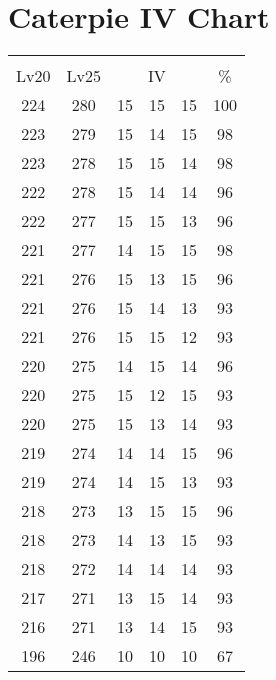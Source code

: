 \documentclass{article}%
\begin{document}
%
\normalsize%
\section{Caterpie IV Chart}%
\label{sec:Caterpie IV Chart}%
\renewcommand{\arraystretch}{1.5}%
\begin{tabular}{|c|c|c|c|c|c|}%
\hline%
\multicolumn{6}{|c|}{\textcolor{white}{ 
\linebreak{Caterpie}
}%
\cellcolor{black}}\\%
\multicolumn{1}{|c}{Lv20}&\multicolumn{1}{c|}{Lv25}&\multicolumn{3}{c|}{IV}&\multicolumn{1}{|c|}{\%}\\%
\hline%
\rowcolor{color100}%
224&280&15&15&15&100\\%
\hline%
\rowcolor{color98}%
223&279&15&14&15&98\\%
\hline%
\rowcolor{color98}%
223&278&15&15&14&98\\%
\hline%
\rowcolor{color96}%
222&278&15&14&14&96\\%
\hline%
\rowcolor{color96}%
222&277&15&15&13&96\\%
\hline%
\rowcolor{color98}%
221&277&14&15&15&98\\%
\hline%
\rowcolor{color96}%
221&276&15&13&15&96\\%
\hline%
\rowcolor{color93}%
221&276&15&14&13&93\\%
\hline%
\rowcolor{color93}%
221&276&15&15&12&93\\%
\hline%
\rowcolor{color96}%
220&275&14&15&14&96\\%
\hline%
\rowcolor{color93}%
220&275&15&12&15&93\\%
\hline%
\rowcolor{color93}%
220&275&15&13&14&93\\%
\hline%
\rowcolor{color96}%
219&274&14&14&15&96\\%
\hline%
\rowcolor{color93}%
219&274&14&15&13&93\\%
\hline%
\rowcolor{color96}%
218&273&13&15&15&96\\%
\hline%
\rowcolor{color93}%
218&273&14&13&15&93\\%
\hline%
\rowcolor{color93}%
218&272&14&14&14&93\\%
\hline%
\rowcolor{color93}%
217&271&13&15&14&93\\%
\hline%
\rowcolor{color93}%
216&271&13&14&15&93\\%
\hline%
\rowcolor{color91}%
196&246&10&10&10&67\\%
\end{tabular}

%
\end{document}
